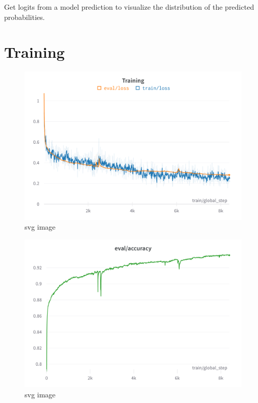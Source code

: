 Get logits from a model  prediction to visualize the distribution of the predicted probabilities.

\section{Training}

\begin{figure}[htp]
    \centering
    \includegraphics[width=\textwidth]{figures/wandb-train-loss-gpt-j-smart-contract.png}
    \caption{svg image}
\end{figure}

\begin{figure}[htp]
    \centering
    \includegraphics[width=\textwidth]{figures/wandb-train-eval-gpt-j-smart-contract.png}
    \caption{svg image}
\end{figure}


